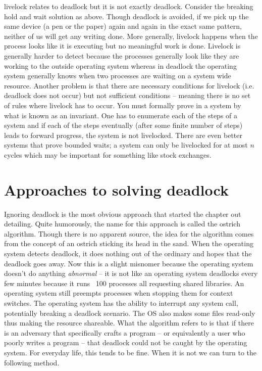 \gls{livelock} relates to deadlock but it is not exactly deadlock. Consider the breaking hold and wait solution as above. Though deadlock is avoided, if we pick up the same device (a pen or the paper) again and again in the exact same pattern, neither of us will get any writing done. More generally, livelock happens when the process looks like it is executing but no meaningful work is done. Livelock is generally harder to detect because the processes generally look like they are working to the outside operating system whereas in deadlock the operating system generally knows when two processes are waiting on a system wide resource. Another problem is that there are necessary conditions for livelock (i.e. deadlock does not occur) but not sufficient conditions -- meaning there is no set of rules where livelock has to occur. You must formally prove in a system by what is known as an invariant. One has to enumerate each of the steps of a system and if each of the steps eventually (after some finite number of steps) leads to forward progress, the system is not livelocked. There are even better systems that prove bounded waits; a system can only be livelocked for at most $n$ cycles which may be important for something like stock exchanges.

\section{Approaches to solving deadlock}

Ignoring deadlock is the most obvious approach that started the chapter out detailing. Quite humorously, the name for this approach is called the \gls{ostrich algorithm}. Though there is no apparent source, the idea for the algorithm comes from the concept of an ostrich sticking its head in the sand. When the operating system detects deadlock, it does nothing out of the ordinary and hopes that the deadlock goes away. Now this is a slight misnomer because the operating system doesn't do anything \textit{abnormal} -- it is not like an operating system deadlocks every few minutes because it runs ~100 processes all requesting shared libraries. An operating system still preempts processes when stopping them for context switches. The operating system has the ability to interrupt any system call, potentially breaking a deadlock scenario. The OS also makes some files read-only thus making the resource shareable. What the algorithm refers to is that if there is an adversary that specifically crafts a program -- or equivalently a user who poorly writes a program -- that deadlock could not be caught by the operating system. For everyday life, this tends to be fine. When it is not we can turn to the following method.

